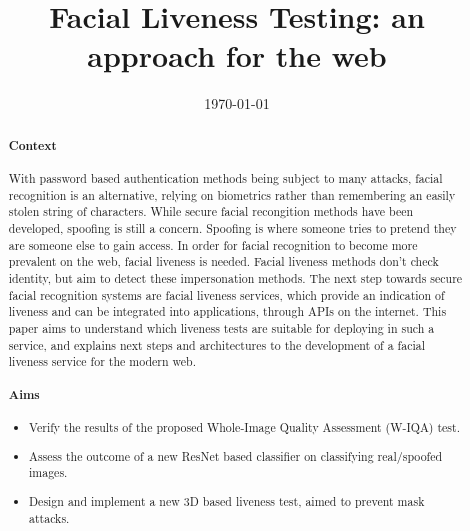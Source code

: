 \documentclass[11pt,a4paper]{article}
\title{Facial Liveness Testing: an approach for the web}
\author{} %
\date{\today}
\begin{document}
\maketitle
\begin{abstract}
\paragraph{Context}
    With password based authentication methods being subject to many attacks, facial recognition is an alternative, relying on biometrics rather than remembering an easily stolen string of characters.
    While secure facial recongition methods have been developed, spoofing is still a concern. Spoofing is where someone tries to pretend they are someone else to gain access.
    In order for facial recognition to become more prevalent on the web, facial liveness is needed. Facial liveness methods don't check identity, but aim to detect these impersonation methods.
    The next step towards secure facial recognition systems are facial liveness services, which provide an indication of liveness and can be integrated into applications, through APIs on the internet.
    This paper aims to understand which liveness tests are suitable for deploying in such a service, and explains next steps and architectures to the development of a facial liveness service for the modern web.

\paragraph{Aims}

    \begin{itemize}
        \item Verify the results of the proposed Whole-Image Quality Assessment (W-IQA) test.
        \item Assess the outcome of a new ResNet based classifier on classifying real/spoofed images.
        \item Design and implement a new 3D based liveness test, aimed to prevent mask attacks.
    \end{itemize}


\end{abstract}
\end{document}

